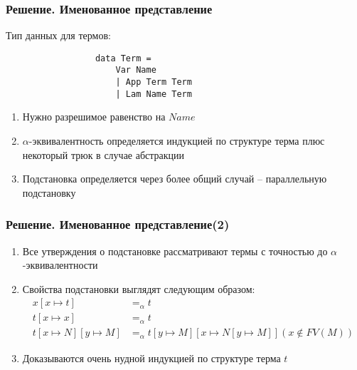 \documentclass{beamer}
\newcommand{\alphaeq}{=_{\alpha}}
\begin{document}
\begin{frame}[fragile=singleslide]\frametitle{Решение. Именованное представление}
    Тип данных для термов:
        \begin{figure}[H]
            \center
            \begin{verbatim}
            data Term =
                Var Name
                | App Term Term
                | Lam Name Term
            \end{verbatim}
        \end{figure}
    \begin{enumerate}
        \item Нужно разрешимое равенство на $Name$
        \item $\alpha$-эквивалентность определяется индукцией по структуре терма плюс некоторый трюк в случае абстракции
        \item Подстановка определяется через более общий случай -- параллельную подстановку
    \end{enumerate}
\end{frame}


\begin{frame}[fragile=singleslide]\frametitle{Решение. Именованное представление(2)}
    \begin{enumerate}
        \item Все утверждения о подстановке рассматривают термы с точностью до $\alpha$-эквивалентности
        \item Свойства подстановки выглядят следующим образом:
            \begin{align*}
                x[x \mapsto t] &\alphaeq t\\
                t[x \mapsto x] &\alphaeq t\\
                t[x \mapsto N][y \mapsto M] &\alphaeq t[y \mapsto M][x \mapsto N[y \mapsto M]] (x \notin FV(M))
            \end{align*}
        \item Доказываются очень нудной индукцией по структуре терма $t$
    \end{enumerate}
\end{frame}
\end{document}
